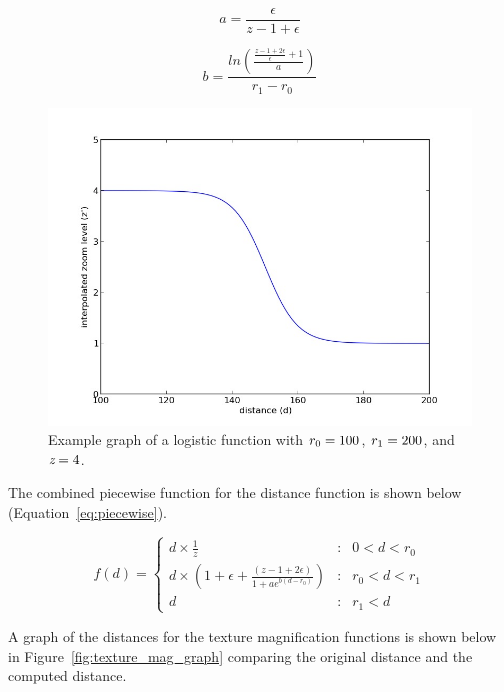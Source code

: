 \begin{equation}
    \label{eq:solve_a}
    a = \frac{\epsilon}{z - 1 + \epsilon}
\end{equation}

\begin{equation}
    \label{eq:solve_b}
    b = \frac{ln\left( \frac{\frac{z - 1 + 2 \epsilon }{\epsilon} + 1}{a}\right) }{r_1 - r_0}
\end{equation}

\begin{figure}[htp] \centering
    \includegraphics[width=0.8\linewidth]{img/logistic_graph.jpg}
    \caption[Logistic Graph]{Example graph of a logistic function with $\emph{$r_0$} = 100$, $\emph{$r_1$} = 200$, and $\emph{z} = 4$.}
    \label{fig:logistic_graph}
\end{figure}

The combined piecewise function for the distance function is shown below (Equation~\ref{eq:piecewise}).

\begin{equation}
    \label{eq:piecewise}
    f(d) = \left\{
        \begin{array}{lcr}
            d \times \frac{1}{z} & : & 0 < d < r_0 \\
            d \times \left( 1 + \epsilon + \frac{(z - 1 + 2\epsilon)}{1 + ae^{b(d-r_0)}}\right) & : & r_0 < d < r_1\\
            d & : & r_1 < d 
        \end{array}
    \right.
\end{equation}

A graph of the distances for the texture magnification functions is shown below in 
Figure~\ref{fig:texture_mag_graph} comparing the original distance and the computed distance.

